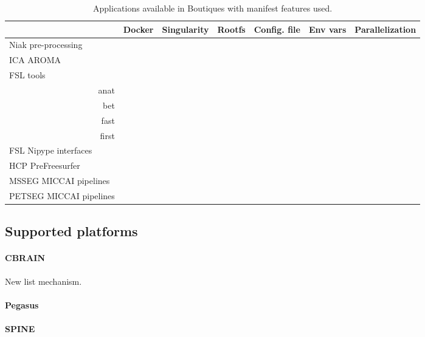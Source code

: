 \documentclass{article}
\begin{document}
\begin{table}
\begin{tabular}{l|ccc|ccc}
    \rowcolor[gray]{0.9}
    &Docker              & Singularity & Rootfs  & Config. file & Env vars  & Parallelization   \\
    \hline
    Niak pre-processing       &\cellcolor{gray!75} &            &         &              &\cellcolor{gray!75}&\cellcolor{gray!75}\\
    ICA AROMA                 &\cellcolor{gray!75} &            &         &              &&\\
    FSL tools &&&&&\\
    \multicolumn{1}{r|}{anat} &                    &            &         &              &&\\
    \multicolumn{1}{r|}{bet}  &                    &            &         &              &&\\
    \multicolumn{1}{r|}{fast} &                    &            &         &              &&\\
    \multicolumn{1}{r|}{first}&                    &            &         &              &&\\
    FSL Nipype interfaces     \\
    HCP PreFreesurfer         &\cellcolor{gray!75} &            &         &             &&\\
    MSSEG MICCAI pipelines    \\
    PETSEG MICCAI pipelines   \\
  \end{tabular} 
  \caption{Applications available in Boutiques with manifest features used.}
  \label{table:applications}
\end{table}
  
\subsection{Supported platforms}

\paragraph{CBRAIN}

New list mechanism.

\paragraph{Pegasus}

\paragraph{SPINE}
\end{document}
